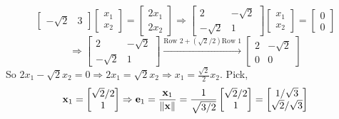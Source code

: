 \begin{enumerate}[font=\bfseries]
\[\begin{bmatrix}
                -\sqrt{2} & 3
            \end{bmatrix}
            \begin{bmatrix}
                x_1 \\
                x_2
            \end{bmatrix}
            =
            \begin{bmatrix}
                2x_1 \\
                2x_2
            \end{bmatrix}
            \Rightarrow
            \begin{bmatrix}
                2 & -\sqrt{2} \\
                -\sqrt{2} & 1
            \end{bmatrix}
            \begin{bmatrix}
                x_1 \\
                x_2
            \end{bmatrix}
            =
            \begin{bmatrix}
                0 \\
                0
            \end{bmatrix}
        \]
        \[
            \Rightarrow
            \begin{bmatrix}
                2 & -\sqrt{2} \\
                -\sqrt{2} & 1
            \end{bmatrix}
            \overset{\text{Row 2} + \left(\sqrt{2}/2\right)\text{Row 1}}{\longrightarrow}
            \begin{bmatrix}
                2 & -\sqrt{2} \\
                0 & 0
            \end{bmatrix}
        \]
        So $2x_1 - \sqrt{2}x_2 = 0 \Rightarrow 2x_1 = \sqrt{2}x_2 \Rightarrow x_1 = \frac{\sqrt{2}}{2}x_2$. Pick,
        \[
            \bold{x}_1 
            =
            \begin{bmatrix}
                \sqrt{2}/2 \\
                1
            \end{bmatrix}
            \Rightarrow
            \bold{e}_1
            =
            \frac{\bold{x}_1}{\left\|\bold{x}\right\|}
            =
            \frac{1}{\sqrt{3/2}}
            \begin{bmatrix}
                \sqrt{2}/2 \\
                1
            \end{bmatrix}
            =
            \begin{bmatrix}
                1/\sqrt{3} \\
                \sqrt{2}/\sqrt{3}
            \end{bmatrix}
        \]
        \newline


\end{enumerate}
